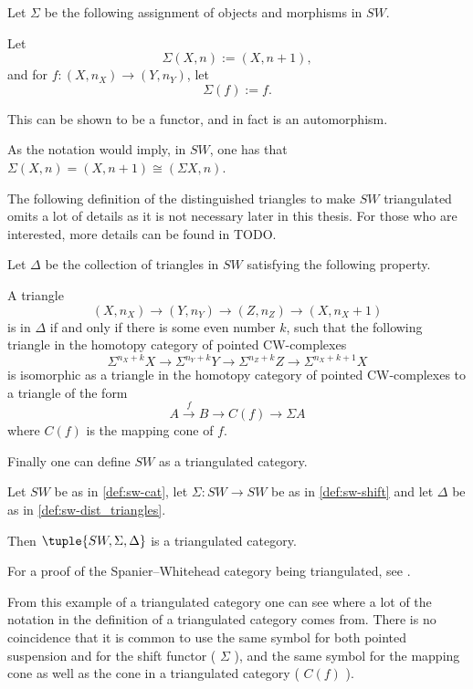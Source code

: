 \begin{definition}
    \label{def:sw-shift}
    Let \( \Sigma \) be the following assignment of objects and morphisms in \( SW \).

    Let
    \[
        \Sigma(X, n) := (X, n + 1),
    \] 
    and for \( f: (X, n_X) \to (Y, n_Y) \), let
    \[
        \Sigma(f) := f.
    \]

    This can be shown to be a functor, and in fact is an automorphism.
\end{definition}

As the notation would imply, in \( SW \), one has that \( \Sigma(X, n) = (X, n + 1) \cong ( \Sigma X, n ) \).

The following definition of the distinguished triangles to make \( SW \) triangulated omits a lot of details as it is not necessary later in this thesis. For those who are interested, more details can be found in TODO.

\begin{definition}
    \label{def:sw-dist_triangles}
    Let \( \Delta \) be the collection of triangles in \( SW \) satisfying the following property.

    A triangle
    \[
        (X, n_X) \to (Y, n_Y) \to (Z, n_Z) \to (X, n_X + 1)
    \]
    is in \( \Delta \) if and only if there is some even number \( k \), such that the following triangle in the homotopy category of pointed CW-complexes
    \[
        \Sigma^{n_X + k} X \to \Sigma^{n_Y + k} Y \to \Sigma^{n_Z + k} Z \to \Sigma^{n_X + k + 1} X
    \]
    is isomorphic as a triangle in the homotopy category of pointed CW-complexes to a triangle of the form
    \[
        A \stackrel{f}{\to} B \to C(f) \to \Sigma A
    \]
    where \( C(f) \) is the mapping cone of \( f \).
\end{definition}

Finally one can define \( SW \) as a triangulated category.

\begin{example}
    Let \( SW \) be as in \autoref{def:sw-cat}, let \( \Sigma: SW \to SW \) be as in \autoref{def:sw-shift} and let \( \Delta \) be as in \autoref{def:sw-dist_triangles}.

    Then \( \tuple{SW, \Sigma, \Delta} \) is a triangulated category.
\end{example}

For a proof of the Spanier--Whitehead category being triangulated, see \cite[Theorem 5.9]{Daria_Bachelor}.

From this example of a triangulated category one can see where a lot of the notation in the definition of a triangulated category comes from. There is no coincidence that it is common to use the same symbol for both pointed suspension and for the shift functor ( \( \Sigma \) ), and the same symbol for the mapping cone as well as the cone in a triangulated category ( \( C(f) \) ).

